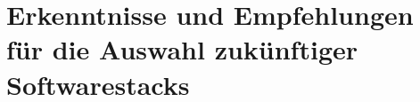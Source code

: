 \label{sec:erkenntnisse}
\section{Erkenntnisse und Empfehlungen für die Auswahl zukünftiger Softwarestacks}